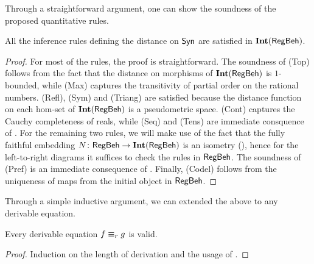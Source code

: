 Through a straightforward argument, one can show the soundness of the proposed quantitative rules.
\begin{lemma}\label{lem:soundness_sublemma}
		All the inference rules defining the distance on $\mathsf{Syn}$ are satisfied in $\mathbf{Int}(\mathsf{RegBeh})$.
	\end{lemma}
	\begin{proof}
		For most of the rules, the proof is straightforward. The soundness of \textsf{(Top)} follows from the fact that the distance on morphisms of $\mathbf{Int}(\mathsf{RegBeh})$ is $1$-bounded, while \textsf{(Max)} captures the transitivity of partial order on the rational numbers. \textsf{(Refl)}, \textsf{(Sym)} and \textsf{(Triang)} are satisfied because the distance function on each hom-set of $\mathbf{Int}(\mathsf{RegBeh})$ is a pseudometric space. \textsf{(Cont)} captures the Cauchy completeness of reals, while \textsf{(Seq)} and \textsf{(Tens)} are immediate consquence of . For the remaining two rules, we will make use of the fact that the fully faithful embedding $N \colon \mathsf{RegBeh} \to \mathbf{Int}(\mathsf{RegBeh})$ is an isometry (), hence for the left-to-right diagrams it suffices to check the rules in $\mathsf{RegBeh}$. The soundness of \textsf{(Pref)} is an immediate consequence of . Finally, \textsf{(Codel)} follows from the uniqueness of maps from the initial object in $\mathsf{RegBeh}$.
		\end{proof}
		Through a simple inductive argument, we can extended the above to any derivable equation.
\begin{theorem}\label{c3:thm:soundness}
Every derivable equation $f \equiv_{r} g$ is valid.
\end{theorem}
\begin{proof}
	Induction on the length of derivation and the usage of .
\end{proof}
